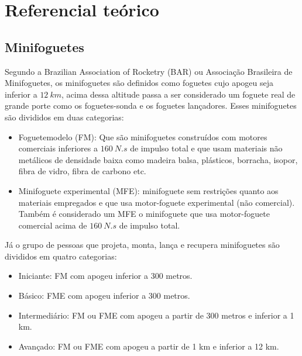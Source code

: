 \chapter{Referencial teórico}


\section{Minifoguetes}

Segundo a Brazilian Association of Rocketry (BAR) ou Associação Brasileira de Minifoguetes,  os minifoguetes são definidos como foguetes cujo apogeu seja inferior a $12 \ km$, acima dessa altitude passa a ser considerado um foguete real de grande porte como os foguetes-sonda e os foguetes lançadores. Esses minifoguetes são divididos em duas categorias:


 \begin{itemize}
   \item Foguetemodelo (FM): Que são minifoguetes construídos com motores comerciais inferiores a $160 \ N.s$ de impulso total e que usam materiais não metálicos de densidade baixa como madeira balsa, plásticos, borracha, isopor, fibra de vidro, fibra de carbono etc.  
   
   \item Minifoguete experimental (MFE): minifoguete sem restrições quanto aos materiais empregados e que usa motor-foguete experimental (não comercial). Também é considerado um MFE o minifoguete que usa motor-foguete comercial acima de $160 \ N.s$ de impulso total.

 \end{itemize}




Já o grupo de pessoas que projeta, monta, lança e recupera minifoguetes são divididos em quatro categorias:



 \begin{itemize}
   \item Iniciante:  FM com apogeu inferior a 300 metros.
   
   
   \item Básico: FME com apogeu inferior a 300 metros.
   
   
   \item Intermediário: FM ou FME com apogeu a partir de 300 metros e inferior a 1 km.
   
   
   \item Avançado: FM ou FME com apogeu a partir de 1 km e inferior a 12 km. 
   
 \end{itemize}


